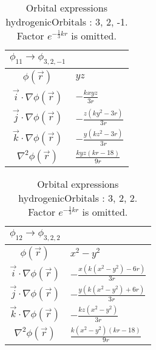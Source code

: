 \begin{table}
\begin{center}
\begin{tabular}{c|l}
$\phi_{11} \rightarrow \phi_{3, 2, -1}$\\
\hline
$\phi(\vec r)$ & $y z$\\
\hline
$\vec i\cdot \nabla \phi(\vec r)$ & $- \frac{k x y z}{3 r}$\\
$\vec j\cdot \nabla \phi(\vec r)$ & $- \frac{z \left(k y^{2} - 3 r\right)}{3 r}$\\
$\vec k\cdot \nabla \phi(\vec r)$ & $- \frac{y \left(k z^{2} - 3 r\right)}{3 r}$\\
\hline
$\nabla^2 \phi(\vec r)$ & $\frac{k y z \left(k r -18\right)}{9 r}$\\
\end{tabular}
\caption{Orbital expressions hydrogenicOrbitals : 3, 2, -1. Factor $e^{- \frac{1}{3} k r}$ is omitted.}
\end{center}
\end{table}

\clearpage

\begin{table}
\begin{center}
\begin{tabular}{c|l}
$\phi_{12} \rightarrow \phi_{3, 2, 2}$\\
\hline
$\phi(\vec r)$ & $x^{2} - y^{2}$\\
\hline
$\vec i\cdot \nabla \phi(\vec r)$ & $- \frac{x \left(k \left(x^{2} - y^{2}\right) - 6 r\right)}{3 r}$\\
$\vec j\cdot \nabla \phi(\vec r)$ & $- \frac{y \left(k \left(x^{2} - y^{2}\right) + 6 r\right)}{3 r}$\\
$\vec k\cdot \nabla \phi(\vec r)$ & $- \frac{k z \left(x^{2} - y^{2}\right)}{3 r}$\\
\hline
$\nabla^2 \phi(\vec r)$ & $\frac{k \left(x^{2} - y^{2}\right) \left(k r -18\right)}{9 r}$\\
\end{tabular}
\caption{Orbital expressions hydrogenicOrbitals : 3, 2, 2. Factor $e^{- \frac{1}{3} k r}$ is omitted.}
\end{center}
\end{table}


